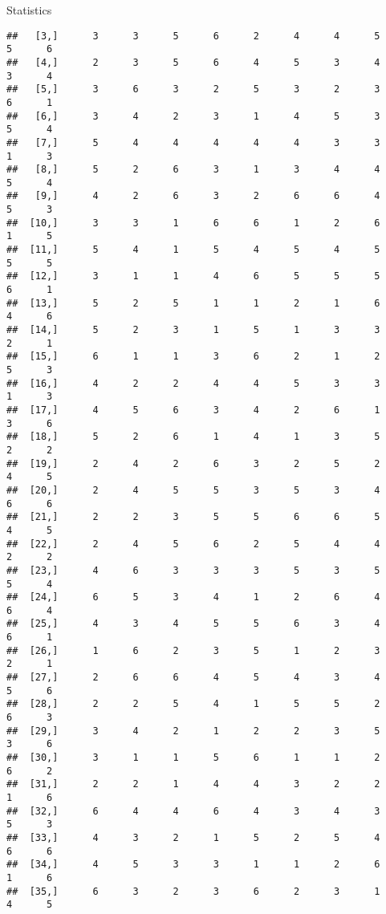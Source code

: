 \documentclass[
  ignorenonframetext,
]{beamer}
\begin{document}
\begin{frame}[fragile]{Statistics}
\begin{verbatim}
##   [3,]      3      3      5      6      2      4      4      5      5      6
##   [4,]      2      3      5      6      4      5      3      4      3      4
##   [5,]      3      6      3      2      5      3      2      3      6      1
##   [6,]      3      4      2      3      1      4      5      3      5      4
##   [7,]      5      4      4      4      4      4      3      3      1      3
##   [8,]      5      2      6      3      1      3      4      4      5      4
##   [9,]      4      2      6      3      2      6      6      4      5      3
##  [10,]      3      3      1      6      6      1      2      6      1      5
##  [11,]      5      4      1      5      4      5      4      5      5      5
##  [12,]      3      1      1      4      6      5      5      5      6      1
##  [13,]      5      2      5      1      1      2      1      6      4      6
##  [14,]      5      2      3      1      5      1      3      3      2      1
##  [15,]      6      1      1      3      6      2      1      2      5      3
##  [16,]      4      2      2      4      4      5      3      3      1      3
##  [17,]      4      5      6      3      4      2      6      1      3      6
##  [18,]      5      2      6      1      4      1      3      5      2      2
##  [19,]      2      4      2      6      3      2      5      2      4      5
##  [20,]      2      4      5      5      3      5      3      4      6      6
##  [21,]      2      2      3      5      5      6      6      5      4      5
##  [22,]      2      4      5      6      2      5      4      4      2      2
##  [23,]      4      6      3      3      3      5      3      5      5      4
##  [24,]      6      5      3      4      1      2      6      4      6      4
##  [25,]      4      3      4      5      5      6      3      4      6      1
##  [26,]      1      6      2      3      5      1      2      3      2      1
##  [27,]      2      6      6      4      5      4      3      4      5      6
##  [28,]      2      2      5      4      1      5      5      2      6      3
##  [29,]      3      4      2      1      2      2      3      5      3      6
##  [30,]      3      1      1      5      6      1      1      2      6      2
##  [31,]      2      2      1      4      4      3      2      2      1      6
##  [32,]      6      4      4      6      4      3      4      3      5      3
##  [33,]      4      3      2      1      5      2      5      4      6      6
##  [34,]      4      5      3      3      1      1      2      6      1      6
##  [35,]      6      3      2      3      6      2      3      1      4      5

\end{verbatim}
\end{frame}
\end{document}
